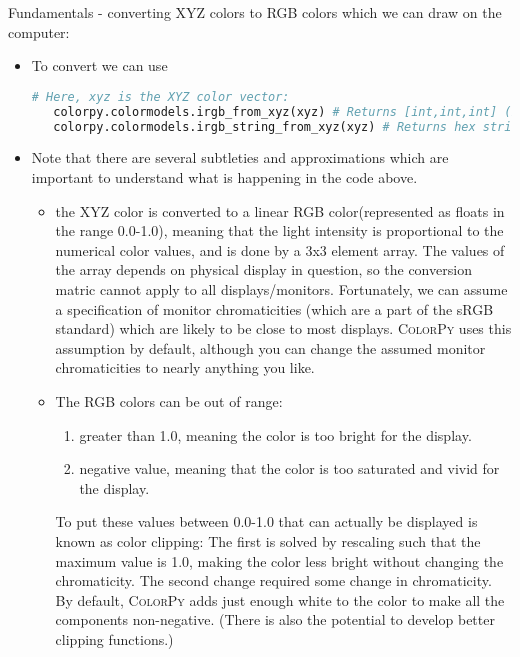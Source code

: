 Fundamentals - converting XYZ colors to RGB colors which we can draw on the computer:
\begin{itemize}
   \item To convert we can use
\begin{lstlisting}[style=FormattedNumber, language=python, frame=none]
   # Here, xyz is the XYZ color vector:
   colorpy.colormodels.irgb_from_xyz(xyz) # Returns [int,int,int] (int in [0,255])
   colorpy.colormodels.irgb_string_from_xyz(xyz) # Returns hex string, e.g. '#FF0000' for red.
\end{lstlisting}

\item 
Note that there are several subtleties and approximations which are important to understand
what is happening in the code above.
   \begin{itemize}
      \item the XYZ color is converted to a linear RGB color(represented as floats in the range 0.0-1.0),
         meaning that the light intensity is 
         proportional to the numerical color values, and is done by a 3x3 element array. The values
         of the array depends on physical display in question, so the conversion matric cannot apply to 
         all displays/monitors. Fortunately, we can assume a specification of monitor chromaticities
         (which are a part of the sRGB standard) which are likely to be close to most displays. 
         \textsc{ColorPy}
         uses this assumption by default, although you can change the assumed monitor chromaticities to nearly
         anything you like.
      \item The RGB colors can be out of range: 
         \begin{enumerate}
            \item greater than 1.0, meaning the color is too bright for the display. 
            \item negative value, meaning that the color is too saturated and vivid for the display.
         \end{enumerate}
         To put these values between 0.0-1.0 that can actually be displayed is known as color clipping:
         The first is solved by rescaling such that the maximum value is 1.0, making the 
         color less bright without changing the chromaticity. The second change required some change in
         chromaticity. By default,  \textsc{ColorPy} adds just enough white to the color to make all the
         components non-negative. (There is also the potential to develop better clipping functions.)

\end{itemize}
\end{itemize}
